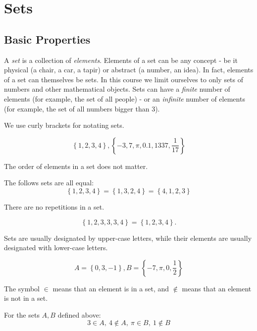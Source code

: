 \section{Sets}
\subsection{Basic Properties}
A \emph{set} is a collection of \emph{elements}. Elements of a set can be any concept - be it physical (a chair, a car, a tapir) or abstract (a number, an idea). In fact, elements of a set can themselves be sets. In this course we limit ourselves to only sets of numbers and other mathematical objects. Sets can have a \emph{finite} number of elements (for example, the set of all people) - or an \emph{infinite} number of elements (for example, the set of all numbers bigger than $3$).

We use curly brackets for notating sets.
\begin{example}
  \begin{equation*}
  \left\{ 1, 2, 3, 4 \right\}, \left\{ -3, 7, \pi, 0.1, 1337, \frac{1}{17} \right\}
  \end{equation*}
\end{example}

The order of elements in a set does not matter.
\begin{example}
  The follows sets are all equal:
  \begin{equation*}
  \left\{ 1,2,3,4 \right\} = \left\{ 1,3,2,4 \right\} = \left\{ 4,1,2,3 \right\}
  \end{equation*}
\end{example}

There are no repetitions in a set.
\begin{example}
  \begin{equation*}
  \left\{ 1,2,3,3,3,4 \right\} = \left\{ 1,2,3,4 \right\}.
  \end{equation*}
\end{example}

Sets are usually designated by upper-case letters, while their elements are usually designated with lower-case letters.
\begin{example}
  \begin{equation*}
  A=\left\{ 0,3,-1 \right\}, B=\left\{ -7, \pi, 0, \frac{1}{2} \right\}
  \end{equation*}
\end{example}

The symbol $\in$ means that an element is in a set, and $\notin$ means that an element is not in a set.
\begin{example}
  For the sets $A,B$ defined above:
  \begin{equation*}
  3\in A,\ 4\notin A,\ \pi\in B,\ 1\notin B
  \end{equation*}
\end{example}

